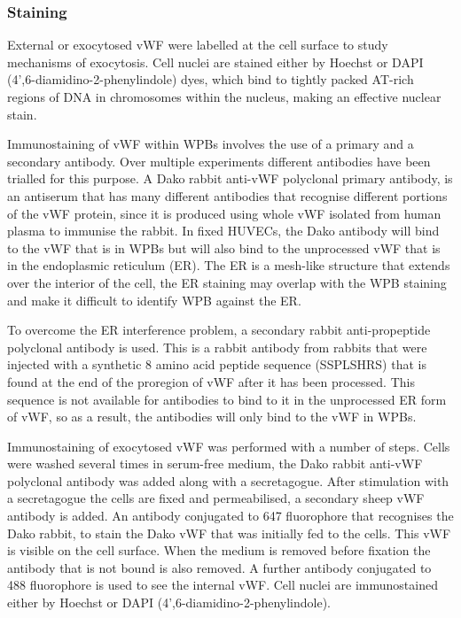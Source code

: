 \subsubsection{Staining}
External or exocytosed vWF were labelled at the cell surface to study mechanisms of exocytosis. Cell nuclei are stained either by Hoechst or DAPI (4',6-diamidino-2-phenylindole) dyes, which bind to tightly packed AT-rich regions of DNA in chromosomes within the nucleus, making an effective nuclear stain.

Immunostaining of vWF within WPBs involves the use of a primary and a secondary antibody. Over multiple experiments different antibodies have been trialled for this purpose. A Dako rabbit anti-vWF polyclonal primary antibody, is an antiserum that has many different antibodies that recognise different portions of the vWF protein, since it is produced using whole vWF isolated from human plasma to immunise the rabbit. In fixed HUVECs, the Dako antibody will bind to the vWF that is in WPBs but will also bind to the unprocessed vWF that is in the endoplasmic reticulum (ER). The ER is a mesh-like structure that extends over the interior of the cell, the ER staining may overlap with the WPB staining and make it difficult to identify WPB against the ER.

To overcome the ER interference problem, a secondary rabbit anti-propeptide polyclonal antibody is used. This is a rabbit antibody from rabbits that were injected with a synthetic 8 amino acid peptide sequence (SSPLSHRS) that is found at the end of the proregion of vWF after it has been processed. This sequence is not available for antibodies to bind to it in the unprocessed ER form of vWF, so as a result, the antibodies will only bind to the vWF in WPBs.

Immunostaining of exocytosed vWF was performed with a number of steps. Cells were washed several times in serum-free medium, the Dako rabbit anti-vWF polyclonal antibody was added along with a secretagogue. After stimulation with a secretagogue the cells are fixed and permeabilised, a secondary sheep vWF antibody is added. An antibody conjugated to 647 fluorophore that recognises the Dako rabbit, to stain the Dako vWF that was initially fed to the cells. This vWF is visible on the cell surface. When the medium is removed before fixation the antibody that is not bound is also removed. A further antibody conjugated to 488 fluorophore is used to see the internal vWF. Cell nuclei are immunostained either by Hoechst or DAPI (4',6-diamidino-2-phenylindole). 

